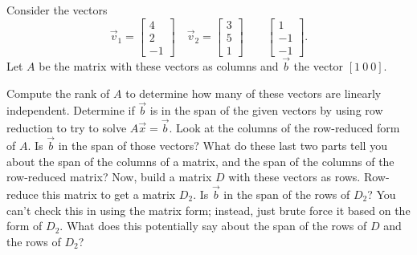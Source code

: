 \documentclass{ximera}
\begin{document}
\begin{exercise}\label{ex:MatReductions}%
    Consider the vectors
    \begin{equation*}
        \vec{v}_1 = \begin{bmatrix} 4 \\ 2 \\ -1 \end{bmatrix} \quad \vec{v}_2 = \begin{bmatrix} 3 \\ 5 \\ 1 \end{bmatrix} \qquad \begin{bmatrix} 1 \\ -1 \\ -1 \end{bmatrix}. 
    \end{equation*}
    Let $A$ be the matrix with these vectors as columns and $\vec{b}$ the vector $[1\ 0 \ 0]$. 
    \begin{tasks}
        \task Compute the rank of $A$ to determine how many of these vectors are linearly independent.
        \task Determine if $\vec{b}$ is in the span of the given vectors by using row reduction to try to solve $A\vec{x} = \vec{b}$.
        \task Look at the columns of the row-reduced form of $A$. Is $\vec{b}$ in the span of those vectors?
        \task What do these last two parts tell you about the span of the columns of a matrix, and the span of the columns of the row-reduced matrix?
        \task Now, build a matrix $D$ with these vectors as rows. Row-reduce this matrix to get a matrix $D_2$. 
        \task Is $\vec{b}$ in the span of the rows of $D_2$? You can't check this in using the matrix form; instead, just brute force it based on the form of $D_2$. What does this potentially say about the span of the rows of $D$ and the rows of $D_2$?
    \end{tasks}
\end{exercise}
\end{document}
